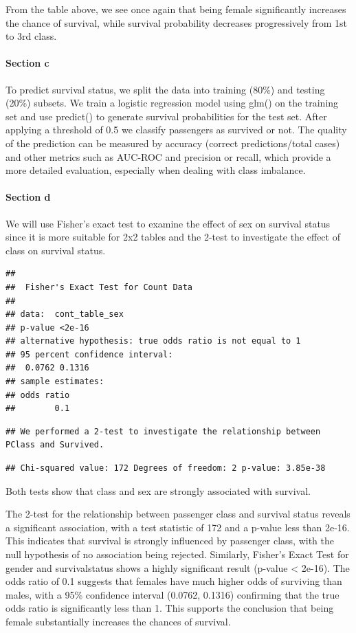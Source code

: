 \documentclass[
  11pt,
]{article}
\begin{document}
From the table above, we see once again that being female significantly
increases the chance of survival, while survival probability decreases
progressively from 1st to 3rd class.

\paragraph{Section c}\label{section-c}

To predict survival status, we split the data into training (80\%) and
testing (20\%) subsets. We train a logistic regression model using glm()
on the training set and use predict() to generate survival probabilities
for the test set. After applying a threshold of 0.5 we classify
passengers as survived or not. The quality of the prediction can be
measured by accuracy (correct predictions/total cases) and other metrics
such as AUC-ROC and precision or recall, which provide a more detailed
evaluation, especially when dealing with class imbalance.

\paragraph{Section d}\label{section-d}

We will use Fisher's exact test to examine the effect of sex on survival
status since it is more suitable for 2x2 tables and the 2-test to
investigate the effect of class on survival status.

\begin{verbatim}
## 
##  Fisher's Exact Test for Count Data
## 
## data:  cont_table_sex
## p-value <2e-16
## alternative hypothesis: true odds ratio is not equal to 1
## 95 percent confidence interval:
##  0.0762 0.1316
## sample estimates:
## odds ratio 
##        0.1
\end{verbatim}

\begin{verbatim}
## We performed a 2-test to investigate the relationship between PClass and Survived.
\end{verbatim}

\begin{verbatim}
## Chi-squared value: 172 Degrees of freedom: 2 p-value: 3.85e-38
\end{verbatim}

Both tests show that class and sex are strongly associated with
survival.

The 2-test for the relationship between passenger class and survival
status reveals a significant association, with a test statistic of 172
and a p-value less than 2e-16. This indicates that survival is strongly
influenced by passenger class, with the null hypothesis of no
association being rejected. Similarly, Fisher's Exact Test for gender
and survivalstatus shows a highly significant result (p-value
\textless{} 2e-16). The odds ratio of 0.1 suggests that females have
much higher odds of surviving than males, with a 95\% confidence
interval (0.0762, 0.1316) confirming that the true odds ratio is
significantly less than 1. This supports the conclusion that being
female substantially increases the chances of survival.
\end{document}
